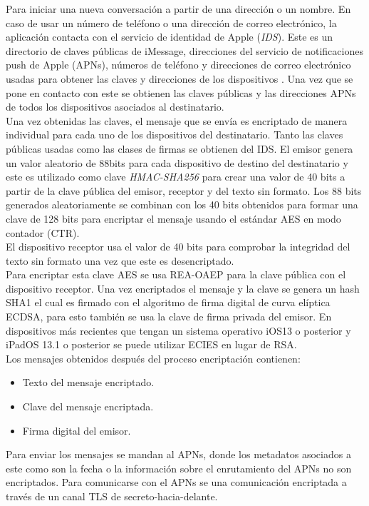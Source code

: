 Para iniciar una nueva conversación a partir de una dirección o un nombre. En caso de usar un número de teléfono o una dirección de correo electrónico, la aplicación contacta con el servicio de identidad de Apple (\emph{IDS}). Este es un directorio de claves públicas de iMessage, direcciones del servicio de notificaciones push de Apple (APNs), números de teléfono y direcciones de correo electrónico usadas para obtener las claves y direcciones de los dispositivos \cite{ids}. Una vez que se pone en contacto con este se obtienen las claves públicas y las direcciones APNs de todos los dispositivos asociados al destinatario.\\
Una vez obtenidas las claves, el mensaje que se envía es encriptado de manera individual para cada uno de los dispositivos del destinatario. Tanto las claves públicas usadas como las clases de firmas se obtienen del IDS. El emisor genera un valor aleatorio de 88bits para cada dispositivo de destino del destinatario y este es utilizado como clave \emph{HMAC-SHA256} para crear una valor de 40 bits a partir de la clave pública del emisor, receptor y del texto sin formato. Los 88 bits generados aleatoriamente se combinan con los 40 bits obtenidos para formar una clave de 128 bits para encriptar el mensaje usando el estándar AES en modo contador (CTR).\\
El dispositivo receptor usa el valor de 40 bits para comprobar la integridad del texto sin formato una vez que este es desencriptado.\\
Para encriptar esta clave AES se usa REA-OAEP para la clave pública con el dispositivo receptor. Una vez encriptados el mensaje y la clave se genera un hash SHA1 el cual es firmado con el algoritmo de firma digital de curva elíptica ECDSA, para esto también se usa la clave de firma privada del emisor. En dispositivos más recientes que tengan un sistema operativo iOS13 o posterior y iPadOS 13.1 o posterior se puede utilizar ECIES en lugar de RSA.\\
Los mensajes obtenidos después del proceso encriptación contienen:
\begin{itemize}
	\item Texto del mensaje encriptado.
	\item Clave del mensaje encriptada.
	\item Firma digital del emisor.
\end{itemize}
Para enviar los mensajes se mandan al APNs, donde los metadatos asociados a este como son la fecha o la información sobre el enrutamiento del APNs no son encriptados. Para comunicarse con el APNs se una comunicación encriptada a través de un canal TLS de secreto-hacia-delante.\\
